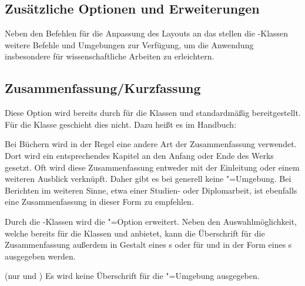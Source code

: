 \begin{Declaration*}{}
\begin{Declaration*}{}
\begin{Declaration*}{}
\section{Zusätzliche Optionen und Erweiterungen}
%
Neben den Befehlen für die Anpassung des Layouts an das \TUDCD stellen die 
\TUDScript-Klassen weitere Befehle und Umgebungen zur Verfügung, um die 
Anwendung insbesondere für wissenschaftliche Arbeiten zu erleichtern.


\subsection{Zusammenfassung/Kurzfassung}
%
%
\begin{Declaration}[%
  v2.02!\Option{abstract=multiple}:ersetzt \Option{abstract=double};%
  v2.02!\Option{abstract=tocleveldown};%
  v2.02!\Option{abstract=markboth};%
  v2.04!\Option{abstract=tocmultiple}%
]{}%
\printdeclarationlist%
%
%
Diese Option wird bereits durch \KOMAScript{} für die Klassen  
und  standardmäßig bereitgestellt. Für die Klasse 
 geschieht dies nicht. Dazu heißt es im Handbuch:
%
\begin{quoting}
Bei Büchern wird in der Regel eine andere Art der Zusammenfassung verwendet. 
Dort wird ein entsprechendes Kapitel an den Anfang oder Ende des Werks gesetzt. 
Oft wird diese Zusammenfassung entweder mit der Einleitung oder einem weiteren 
Ausblick verknüpft. Daher gibt es bei  generell keine 
"=Umgebung. Bei Berichten im weiteren Sinne, etwa einer 
Studien- oder Diplomarbeit, ist ebenfalls eine Zusammenfassung in dieser Form 
zu empfehlen.
\end{quoting}
%
Durch die \TUDScript-Klassen wird die "=Option erweitert. 
Neben den Auswahlmöglichkeit, welche bereits \KOMAScript{} für die Klassen 
 und  anbietet, kann die Überschrift für 
die Zusammenfassung außerdem in Gestalt eines \sectionautorefname{}s oder für 
 und  in der Form eines 
\chapterautorefname{}s ausgegeben werden.
%
\begin{values}{}
\itemfalse(nur  und )
  Es wird keine Überschrift für die "=Umgebung ausgegeben.

\end{values}
\end{Declaration}
\end{Declaration*}
\end{Declaration*}
\end{Declaration*}
